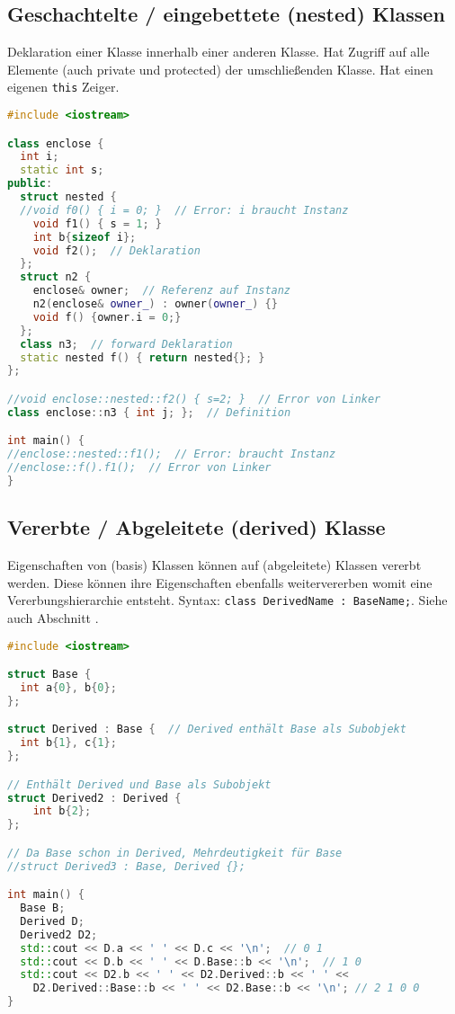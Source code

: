 \subsection{Geschachtelte / eingebettete (nested) Klassen}

Deklaration einer Klasse innerhalb einer anderen Klasse. Hat Zugriff auf alle
Elemente (auch private und protected) der umschließenden Klasse. Hat einen
eigenen \lstinline|this| Zeiger.

\begin{lstlisting}[language=C++]
#include <iostream>

class enclose {
  int i;
  static int s;
public:
  struct nested {
  //void f0() { i = 0; }  // Error: i braucht Instanz
    void f1() { s = 1; }
    int b{sizeof i};
    void f2();  // Deklaration
  };
  struct n2 {
    enclose& owner;  // Referenz auf Instanz
    n2(enclose& owner_) : owner(owner_) {}
    void f() {owner.i = 0;}
  };
  class n3;  // forward Deklaration
  static nested f() { return nested{}; }
};

//void enclose::nested::f2() { s=2; }  // Error von Linker
class enclose::n3 { int j; };  // Definition

int main() {
//enclose::nested::f1();  // Error: braucht Instanz
//enclose::f().f1();  // Error von Linker
}
\end{lstlisting}

\subsection{Vererbte / Abgeleitete (derived) Klasse}

Eigenschaften von (basis) Klassen können auf (abgeleitete) Klassen vererbt
werden. Diese können ihre Eigenschaften ebenfalls weitervererben womit eine
Vererbungshierarchie entsteht. Syntax:
\lstinline|class DerivedName : BaseName;|.
Siehe auch Abschnitt .

\begin{lstlisting}[language=C++]
#include <iostream>

struct Base {
  int a{0}, b{0};
};

struct Derived : Base {  // Derived enthält Base als Subobjekt
  int b{1}, c{1};
};

// Enthält Derived und Base als Subobjekt
struct Derived2 : Derived {
    int b{2};
};

// Da Base schon in Derived, Mehrdeutigkeit für Base
//struct Derived3 : Base, Derived {};

int main() {
  Base B;
  Derived D;
  Derived2 D2;
  std::cout << D.a << ' ' << D.c << '\n';  // 0 1
  std::cout << D.b << ' ' << D.Base::b << '\n';  // 1 0
  std::cout << D2.b << ' ' << D2.Derived::b << ' ' <<
    D2.Derived::Base::b << ' ' << D2.Base::b << '\n'; // 2 1 0 0
}
\end{lstlisting}

